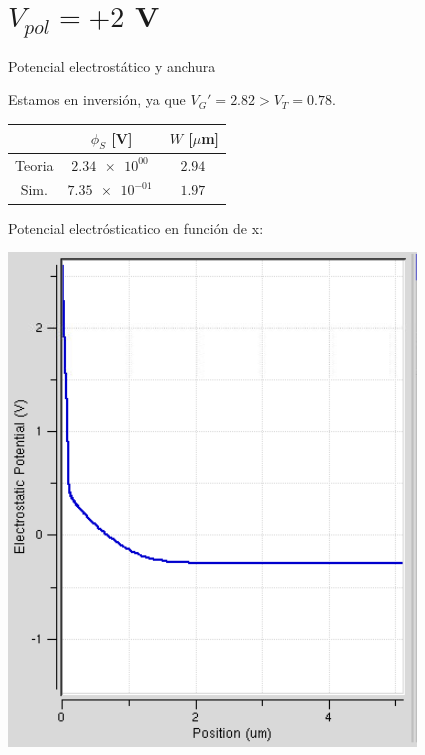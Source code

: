 \documentclass{/home/daniel/GitHub/USC-Physics-Degree-Notes/Notes/Presentacion}
\begin{document}
\section{$V_{pol}=+2$ V} 


\begin{frame}{Potencial electrostático y anchura}
    \begin{minipage}{0.4\linewidth}
        \begin{center}
            \small
            Estamos en inversión, ya que $V_G'=2.82>V_T=0.78$.
            
            \vspace*{1em}

            \begin{tabular}{ccc}
                \toprule
                & $\phi_S$ [V] & $W$ [$\mu$m]   \\ \midrule
                Teoria & $\SI{2.34e+00}{}$ & $\SI{2.94}{}$ \\
                Sim.   & $\SI{7.35e-01}{}$ & $\SI{1.97}{}$  \\
                \bottomrule
            \end{tabular}
        \end{center}
    \end{minipage}
    \hfill
    \begin{minipage}{0.55\linewidth} \centering
        Potencial electrósticatico en función de x:

        \vspace*{1em}
        
        \includegraphics[width=0.7\linewidth]{../Imagenes/1-Potencial.png}
    \end{minipage}
\end{frame}
\end{document}

